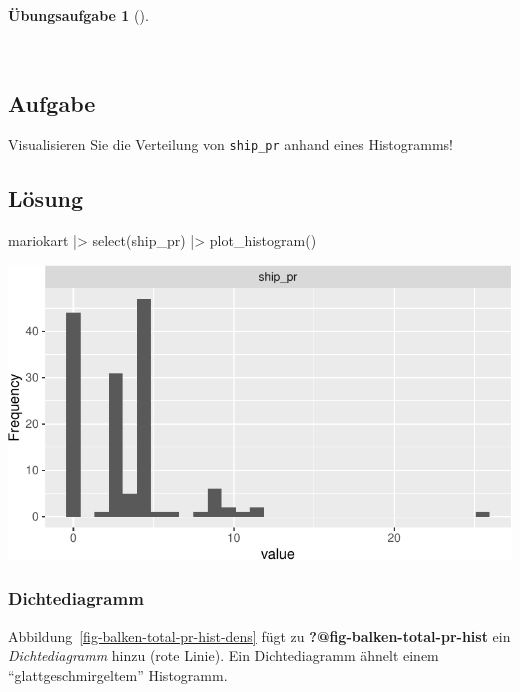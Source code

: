 \documentclass[
  a4paper,
  DIV=11]{scrreprt}
\newenvironment{Shaded}{\begin{snugshade}}{\end{snugshade}}
\newcommand{\FunctionTok}[1]{\textcolor[rgb]{0.28,0.35,0.67}{#1}}
\newcommand{\NormalTok}[1]{\textcolor[rgb]{0.00,0.23,0.31}{#1}}
\newcommand{\SpecialCharTok}[1]{\textcolor[rgb]{0.37,0.37,0.37}{#1}}
\theoremstyle{definition}
\newtheorem{exercise}{Übungsaufgabe}[chapter]
\theoremstyle{definition}
\theoremstyle{definition}
\theoremstyle{remark}
\begin{document}
\begin{exercise}[]\protect\hypertarget{exr-histo-ship-pr}{}\label{exr-histo-ship-pr}

~

\subsection{Aufgabe}

Visualisieren Sie die Verteilung von \texttt{ship\_pr} anhand eines
Histogramms!

\subsection{Lösung}

\begin{Shaded}
\begin{Highlighting}[]
\NormalTok{mariokart }\SpecialCharTok{|\textgreater{}} 
  \FunctionTok{select}\NormalTok{(ship\_pr) }\SpecialCharTok{|\textgreater{}} 
  \FunctionTok{plot\_histogram}\NormalTok{()}
\end{Highlighting}
\end{Shaded}

\includegraphics{040-verbildlichen_files/figure-pdf/unnamed-chunk-14-1.pdf}

\end{exercise}

\subsubsection{Dichtediagramm}\label{dichtediagramm}

Abbildung~\ref{fig-balken-total-pr-hist-dens} fügt zu
\textbf{?@fig-balken-total-pr-hist} ein \emph{Dichtediagramm} hinzu
(rote Linie). Ein Dichtediagramm ähnelt einem ``glattgeschmirgeltem''
Histogramm.
\end{document}
